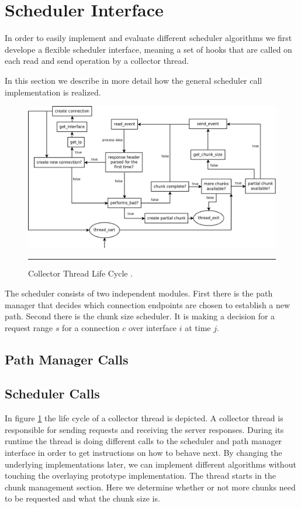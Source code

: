 \section{Scheduler Interface}

\label{sec:scheduler-interface}

In order to easily implement and evaluate different scheduler algorithms we first develope a flexible scheduler interface, meaning a set of hooks that are called on each read and send operation by a collector thread. 

In this section we describe in more detail how the general scheduler call implementation is realized. 

\begin{figure}[htbp]
	\centering
		\includegraphics[width=0.48\linewidth]{Figures/scheduler_impl_1}
		\rule{35em}{0.5pt}
	\caption[Collector Thread]{Collector Thread Life Cycle .}
	\label{fig:scheduler_impl_1}
\end{figure}

The scheduler consists of two independent modules. 
First there is the path manager that decides which connection endpoints are chosen to establish a new path. 
Second there is the chunk size scheduler. 
It is making a decision for a request range $s$ for a connection $c$ over interface $i$ at time $j$.

\subsection{Path Manager Calls}
\label{sec:path-manager-calls}

\subsection{Scheduler Calls}
\label{sec:scheduler-calls}

In figure \ref{fig:scheduler_impl_1} the life cycle of a collector thread is depicted. 
A collector thread is responsible for sending requests and receiving the server responses.
During its runtime the thread is doing different calls to the scheduler and path manager interface in order to get instructions on how to behave next. 
By changing the underlying implementations later, we can implement different algorithms without touching the overlaying prototype implementation. 
The thread starts in the chunk management section. 
Here we determine whether or not more chunks need to be requested and what the chunk size is. 

